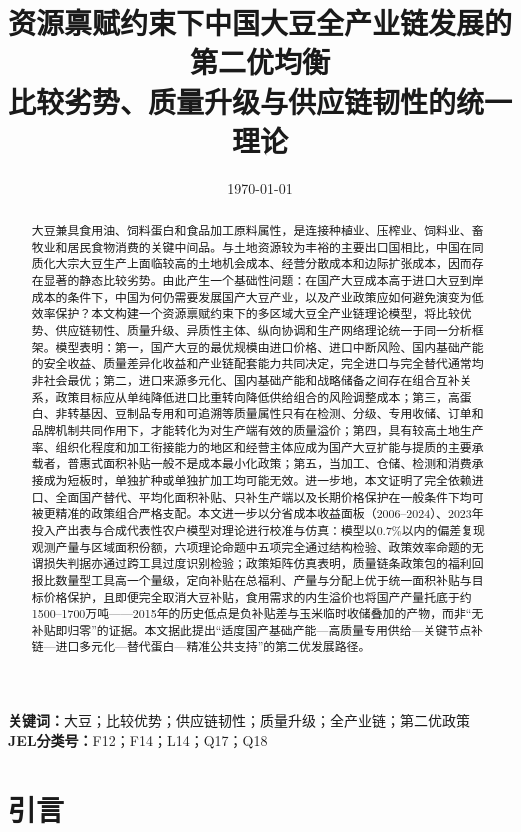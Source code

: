\documentclass[UTF8,zihao=-4,fontset=fandol]{ctexart}
\title{资源禀赋约束下中国大豆全产业链发展的第二优均衡\\
\large 比较劣势、质量升级与供应链韧性的统一理论}
\author{\quad}
\date{\today}
\numberwithin{equation}{section}
\theoremstyle{definition}
\theoremstyle{remark}
\begin{document}
\maketitle

\begin{abstract}
大豆兼具食用油、饲料蛋白和食品加工原料属性，是连接种植业、压榨业、饲料业、畜牧业和居民食物消费的关键中间品。与土地资源较为丰裕的主要出口国相比，中国在同质化大宗大豆生产上面临较高的土地机会成本、经营分散成本和边际扩张成本，因而存在显著的静态比较劣势。由此产生一个基础性问题：在国产大豆成本高于进口大豆到岸成本的条件下，中国为何仍需要发展国产大豆产业，以及产业政策应如何避免演变为低效率保护？本文构建一个资源禀赋约束下的多区域大豆全产业链理论模型，将比较优势、供应链韧性、质量升级、异质性主体、纵向协调和生产网络理论统一于同一分析框架。模型表明：第一，国产大豆的最优规模由进口价格、进口中断风险、国内基础产能的安全收益、质量差异化收益和产业链配套能力共同决定，完全进口与完全替代通常均非社会最优；第二，进口来源多元化、国内基础产能和战略储备之间存在组合互补关系，政策目标应从单纯降低进口比重转向降低供给组合的风险调整成本；第三，高蛋白、非转基因、豆制品专用和可追溯等质量属性只有在检测、分级、专用收储、订单和品牌机制共同作用下，才能转化为对生产端有效的质量溢价；第四，具有较高土地生产率、组织化程度和加工衔接能力的地区和经营主体应成为国产大豆扩能与提质的主要承载者，普惠式面积补贴一般不是成本最小化政策；第五，当加工、仓储、检测和消费承接成为短板时，单独扩种或单独扩加工均可能无效。进一步地，本文证明了完全依赖进口、全面国产替代、平均化面积补贴、只补生产端以及长期价格保护在一般条件下均可被更精准的政策组合严格支配。本文进一步以分省成本收益面板（2006--2024）、2023年投入产出表与合成代表性农户模型对理论进行校准与仿真：模型以0.7\%以内的偏差复现观测产量与区域面积份额，六项理论命题中五项完全通过结构检验、政策效率命题的无谓损失判据亦通过跨工具过度识别检验；政策矩阵仿真表明，质量链条政策包的福利回报比数量型工具高一个量级，定向补贴在总福利、产量与分配上优于统一面积补贴与目标价格保护，且即便完全取消大豆补贴，食用需求的内生溢价也将国产产量托底于约1500--1700万吨——2015年的历史低点是负补贴差与玉米临时收储叠加的产物，而非“无补贴即归零”的证据。本文据此提出“适度国产基础产能—高质量专用供给—关键节点补链—进口多元化—替代蛋白—精准公共支持”的第二优发展路径。
\end{abstract}

\noindent\textbf{关键词：}大豆；比较优势；供应链韧性；质量升级；全产业链；第二优政策\\
\textbf{JEL分类号：}F12；F14；L14；Q17；Q18

\section{引言}
\end{document}
